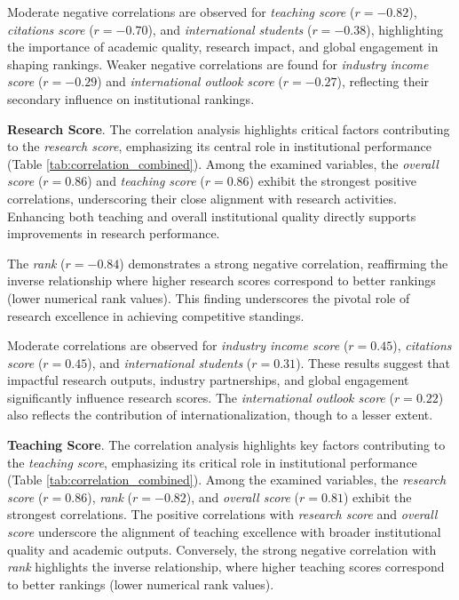 \documentclass[conference]{IEEEtran}
\begin{document}
Moderate negative correlations are observed for \textit{teaching score} ($r = -0.82$), \textit{citations score} ($r = -0.70$), and \textit{international students} ($r = -0.38$), highlighting the importance of academic quality, research impact, and global engagement in shaping rankings. Weaker negative correlations are found for \textit{industry income score} ($r = -0.29$) and \textit{international outlook score} ($r = -0.27$), reflecting their secondary influence on institutional rankings.


\textbf{Research Score}. The correlation analysis highlights critical factors contributing to the \textit{research score}, emphasizing its central role in institutional performance (Table \ref{tab:correlation_combined}). Among the examined variables, the \textit{overall score} ($r = 0.86$) and \textit{teaching score} ($r = 0.86$) exhibit the strongest positive correlations, underscoring their close alignment with research activities. Enhancing both teaching and overall institutional quality directly supports improvements in research performance.

The \textit{rank} ($r = -0.84$) demonstrates a strong negative correlation, reaffirming the inverse relationship where higher research scores correspond to better rankings (lower numerical rank values). This finding underscores the pivotal role of research excellence in achieving competitive standings.

Moderate correlations are observed for \textit{industry income score} ($r = 0.45$), \textit{citations score} ($r = 0.45$), and \textit{international students} ($r = 0.31$). These results suggest that impactful research outputs, industry partnerships, and global engagement significantly influence research scores. The \textit{international outlook score} ($r = 0.22$) also reflects the contribution of internationalization, though to a lesser extent.


\textbf{Teaching Score}. The correlation analysis highlights key factors contributing to the \textit{teaching score}, emphasizing its critical role in institutional performance (Table \ref{tab:correlation_combined}). Among the examined variables, the \textit{research score} ($r = 0.86$), \textit{rank} ($r = -0.82$), and \textit{overall score} ($r = 0.81$) exhibit the strongest correlations. The positive correlations with \textit{research score} and \textit{overall score} underscore the alignment of teaching excellence with broader institutional quality and academic outputs. Conversely, the strong negative correlation with \textit{rank} highlights the inverse relationship, where higher teaching scores correspond to better rankings (lower numerical rank values).
\end{document}
